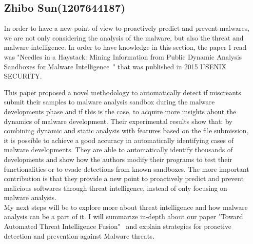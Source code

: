 \documentclass[11pt]{article}
\begin{document}
		\subsection{Zhibo Sun(1207644187)}
		In order to have a new point of view to proactively predict and prevent malwares, we are not only considering the analysis of the malware, but also the threat and malware intelligence. In order to have knowledge in this section, the paper I read was "Needles in a Haystack: Mining Information from Public Dynamic Analysis Sandboxes for Malware Intelligence~\cite{graziano2015needles}" that was published in 2015 USENIX SECURITY.
		
		This paper proposed a novel methodology to automatically detect if miscreants submit their samples to malware analysis sandbox during the malware developments phase and if this is the case, to acquire more insights about the dynamics of malware development. Their experimental results show that: by combining dynamic and static analysis with features based on the file submission, it is possible to achieve a good accuracy in automatically identifying cases of malware developments. They are able to automatically identify thousands of developments and show how the authors modify their programs to test their functionalities or to evade detections from known sandboxes. The more important contribution is that they provide a new point to proactively predict and prevent malicious softwares through threat intelligence, instead of only focusing on malware analysis.\\
		My next steps will be to explore more about threat intelligence and how malware analysis can be a part of it. I will summarize in-depth about our paper "Toward Automated Threat Intelligence Fusion"~\cite{moditowards} and explain strategies for proactive detection and prevention against Malware threats.
		
\end{document}
